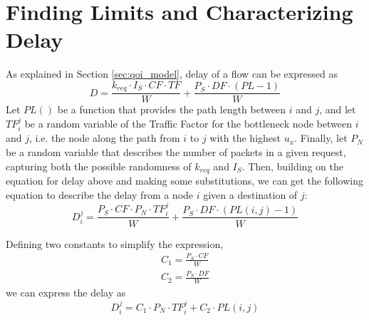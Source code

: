 \section{Finding Limits and Characterizing Delay}
\label{sec:delay_char}
As explained in Section \ref{sec:qoi_model}, delay of a flow can be expressed as
\begin{equation}
	D = \frac{ k_{req} \cdot I_S \cdot CF \cdot TF}{W} + \frac{P_S \cdot DF \cdot (PL-1)}{W}
\end{equation}
%
Let $PL()$ be a function that provides the path length between $i$ and $j$, and let $TF_{i}^{j}$ be a random variable of the Traffic Factor for the bottleneck node between $i$ and $j$, i.e. the node along the path from $i$ to $j$ with the highest $u_x$.  Finally, let $P_N$ be a random variable that describes the number of packets in a given request, capturing both the possible randomness of $k_{req}$ and $I_S$.  
Then, building on the equation for delay above and making some substitutions, we can get the following equation to describe the delay from a node $i$ given a destination of $j$:
\begin{equation}
	D_{i}^{j} = \frac{ P_S \cdot CF \cdot P_N \cdot TF_{i}^{j}}{W}  + \frac{P_S \cdot DF \cdot (PL(i,j)-1)}{W}
\end{equation}

Defining two constants to simplify the expression,
\begin{eqnarray*}
	C_1 = \frac{P_S \cdot CF}{W} \\
	C_2 = \frac{P_S \cdot DF}{W}
\end{eqnarray*}
we can express the delay as
\begin{equation}
	D_{i}^{j} = C_1 \cdot P_N \cdot TF_{i}^{j} + C_2 \cdot PL(i,j)
\end{equation}

